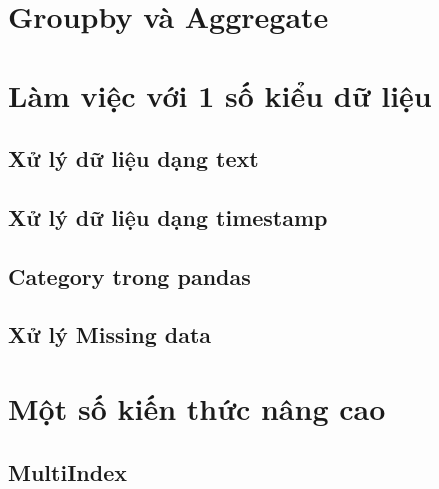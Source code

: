 \documentclass[
]{book}
\begin{document}
\hypertarget{groupby-vuxe0-aggregate}{%
\chapter{Groupby và Aggregate}\label{groupby-vuxe0-aggregate}}

\hypertarget{luxe0m-viux1ec7c-vux1edbi-1-sux1ed1-kiux1ec3u-dux1eef-liux1ec7u}{%
\chapter{Làm việc với 1 số kiểu dữ liệu}\label{luxe0m-viux1ec7c-vux1edbi-1-sux1ed1-kiux1ec3u-dux1eef-liux1ec7u}}

\hypertarget{xux1eed-luxfd-dux1eef-liux1ec7u-dux1ea1ng-text}{%
\section{Xử lý dữ liệu dạng text}\label{xux1eed-luxfd-dux1eef-liux1ec7u-dux1ea1ng-text}}

\hypertarget{xux1eed-luxfd-dux1eef-liux1ec7u-dux1ea1ng-timestamp}{%
\section{Xử lý dữ liệu dạng timestamp}\label{xux1eed-luxfd-dux1eef-liux1ec7u-dux1ea1ng-timestamp}}

\hypertarget{category-trong-pandas}{%
\section{Category trong pandas}\label{category-trong-pandas}}

\hypertarget{xux1eed-luxfd-missing-data}{%
\section{Xử lý Missing data}\label{xux1eed-luxfd-missing-data}}

\hypertarget{mux1ed9t-sux1ed1-kiux1ebfn-thux1ee9c-nuxe2ng-cao}{%
\chapter{Một số kiến thức nâng cao}\label{mux1ed9t-sux1ed1-kiux1ebfn-thux1ee9c-nuxe2ng-cao}}

\hypertarget{multiindex}{%
\section{MultiIndex}\label{multiindex}}
\end{document}
